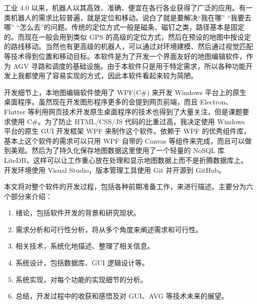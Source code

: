 
工业 4.0 以来，机器人以其高效、准确、便宜在各行各业获得了广泛的应用。有一类机器人的需求比较普遍，就是定位和移动。说白了就是要解决``我在哪'' ``我要去哪'' ``怎么去''的问题。传统的定位方式一般是磁条、磁钉之类，路径基本是固定的。而现在一般会用到类似 GPS 的高级的定位方式，然后在预设的地图中按设定的路线移动。当然也有更高级的机器人，可以通过对环境建模、然后通过视觉匹配等技术得到位置和移动目标。本软件是为了开发一个界面友好的地图编辑软件，作为 AGV 寻路和调度的基础设施。由于本软件只是用于特定需求，所以各种功能开发上我都使用了容易实现的方式，因此本软件看起来较为简陋。

开发细节上，本地图编辑软件使用了 WPF(C\#) 来开发 Windows 平台上的原生桌面程序。虽然现在开发图形程序更多的会提到网页前端，而且 Electron、Flutter 等利用网页技术开发原生桌面程序的技术也得到了大量关注，但是课题要求使用 C\#。为了防止 HTML/CSS/JS 代码的比重过高，我决定使用 Windows 平台的原生 GUI 开发框架 WPF 来制作这个软件。依赖于 WPF 的优秀组件库，基本上这个软件的需求可以只用 WPF 自带的 Canvas 等组件来完成，而且可以做到美观。然后为了持久化保存地图数据这里使用了一个轻量的 NoSQL 库 LiteDB，这样可以让工作重心放在处理和显示地图数据上而不是折腾数据库上。开发环境使用 Visual Studio，版本管理工具使用 Git 并开源到 GitHub。

本文将对整个软件的开发过程，包括各种前期准备工作，来进行描述。主要分为六个部分来介绍：

\begin{enumerate}
  \item 绪论，包括软件开发的背景和研究现状。
  \item 需求分析和可行性分析，将从多个角度来阐述需求和可行性。
  \item 相关技术，系统化地描述、整理了相关信息。
  \item 系统设计，包括数据库、GUI 逻辑设计等。
  \item 系统实现，对每个功能的实现细节的分析。
  \item 总结，开发过程中的收获和感悟及对 GUI、AVG 等技术未来的展望。
\end{enumerate}
